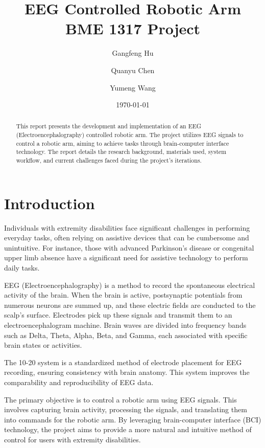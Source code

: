 \documentclass[12pt]{report}
\title{EEG Controlled Robotic Arm \\ \large{BME 1317 Project}}
\author{Gangfeng Hu \and Quanyu Chen \and Yumeng Wang}
\date{\today}
\begin{document}
\maketitle

\begin{abstract}
This report presents the development and implementation of an EEG (Electroencephalography) controlled robotic arm. The project utilizes EEG signals to control a robotic arm, aiming to achieve tasks through brain-computer interface technology. The report details the research background, materials used, system workflow, and current challenges faced during the project's iterations.
\end{abstract}

\tableofcontents


\chapter{Introduction}
Individuals with extremity disabilities face significant challenges in performing everyday tasks, often relying on assistive devices that can be cumbersome and unintuitive. For instance, those with advanced Parkinson's disease or congenital upper limb absence have a significant need for assistive technology to perform daily tasks.

EEG (Electroencephalography) is a method to record the spontaneous electrical activity of the brain. When the brain is active, postsynaptic potentials from numerous neurons are summed up, and these electric fields are conducted to the scalp's surface. Electrodes pick up these signals and transmit them to an electroencephalogram machine. Brain waves are divided into frequency bands such as Delta, Theta, Alpha, Beta, and Gamma, each associated with specific brain states or activities.

The 10-20 system is a standardized method of electrode placement for EEG recording, ensuring consistency with brain anatomy. This system improves the comparability and reproducibility of EEG data.

The primary objective is to control a robotic arm using EEG signals. This involves capturing brain activity, processing the signals, and translating them into commands for the robotic arm. By leveraging brain-computer interface (BCI) technology, the project aims to provide a more natural and intuitive method of control for users with extremity disabilities.
\end{document}
